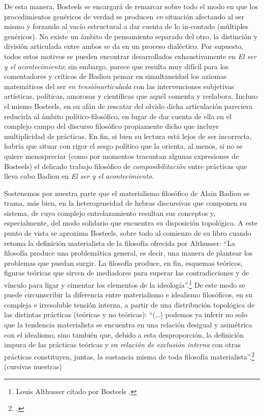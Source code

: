 De esta manera, Bosteels se encargará de remarcar sobre todo el modo en que los procedimientos genéricos de verdad se producen \emph{en} situación afectando al ser mismo y forzando al vacío estructural a dar cuenta de lo in-contado (múltiples genéricos). No existe un ámbito de pensamiento separado del otro, la distinción y división articulada entre ambos se da en un proceso dialéctico. Por supuesto, todos estos motivos se pueden encontrar desarrollados exhaustivamente en \emph{El ser y el acontecimiento}; sin embargo, parece que resulta muy difícil para los comentadores y críticos de Badiou pensar en simultaneidad los axiomas matemáticos del ser \emph{en tensiónarticulada} con las intervenciones subjetivas artísticas, políticas, amorosas y científicas que aquél comenta y reelabora. Incluso el mismo Bosteels, en su afán de rescatar del olvido dicha articulación pareciera reducirla al ámbito político-filosófico, en lugar de dar cuenta de ella en el complejo campo del discurso filosófico propiamente dicho que incluye  multiplicidad de prácticas. En fin, si bien su lectura está lejos de ser incorrecta, habría que situar con rigor el sesgo político que la orienta, al menos, si no se quiere menospreciar (como por momentos trasuntan algunas expresiones de Bosteels) el delicado trabajo filosófico de \emph{composibilitación} entre prácticas que lleva cabo Badiou en \emph{El ser y el acontecimiento}.

Sostenemos por nuestra parte que el materialismo filosófico de Alain Badiou se trama, más bien, en la heterogeneidad de hebras discursivas que componen su sistema, de cuyo complejo entrelazamiento resultan sus conceptos y, especialmente, del modo solidario que encuentra su disposición topológica. A este punto de vista se aproxima Bosteels, sobre todo al comienzo de su libro  cuando retoma la definición materialista de la filosofía ofrecida por Althusser: \enquote{La filosofía produce una problemática general, es decir, una manera de plantear  los problemas que puedan surgir. La filosofía produce, en fin, esquemas teóricos, figuras teóricas que sirven de mediadores para superar las contradicciones y de vínculo para ligar y cimentar los elementos de la ideología}.\footnote{Louis Althusser citado por Bosteels \parencite[][17]{@7022-BOSTEELS2007}.} De este modo se puede circunscribir la diferencia entre materialismo e idealismo filosóficos, en su compleja e irresoluble tensión interna, a partir de una distribución topológica de las distintas prácticas (teóricas y no teóricas): \enquote{(\ldots) podemos ya inferir no solo que la tendencia materialista se encuentra en una relación desigual y asimétrica con el idealismo, sino también que, debido a esta desproporción, la definición impura de las prácticas teóricas y su \emph{relación de exclusión interna} con otras prácticas constituyen, juntas, la sustancia misma de toda filosofía materialista}.\footcite[][18]{@7022-BOSTEELS2007} (cursivas nuestras)


